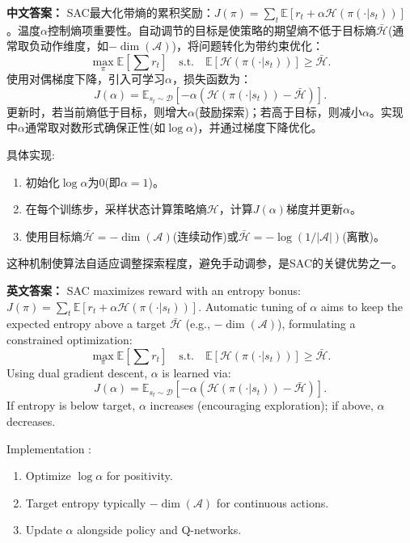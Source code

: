 \documentclass[10pt,a4paper]{ctexart}
\begin{document}
\textbf{中文答案：}  
SAC最大化带熵的累积奖励：\(J(\pi) = \sum_t \mathbb{E}[r_t + \alpha \mathcal{H}(\pi(\cdot|s_t))]\)。温度\(\alpha\)控制熵项重要性。自动调节的目标是使策略的期望熵不低于目标熵\(\bar{\mathcal{H}}\)(通常取负动作维度，如\(-\dim(\mathcal{A})\))，将问题转化为带约束优化：
\[
\max_\pi \mathbb{E}[\sum r_t] \quad \text{s.t.} \quad \mathbb{E}[\mathcal{H}(\pi(\cdot|s_t))] \ge \bar{\mathcal{H}}.
\]  
使用对偶梯度下降，引入可学习\(\alpha\)，损失函数为：
\[
J(\alpha) = \mathbb{E}_{s_t \sim \mathcal{D}} \left[ -\alpha \left( \mathcal{H}(\pi(\cdot|s_t)) - \bar{\mathcal{H}} \right) \right].
\]  
更新时，若当前熵低于目标，则增大\(\alpha\)(鼓励探索)；若高于目标，则减小\(\alpha\)。实现中\(\alpha\)通常取对数形式确保正性(如\(\log \alpha\))，并通过梯度下降优化。

 具体实现:
\begin{enumerate}
    \item 初始化\(\log \alpha\)为0(即\(\alpha=1\))。
    \item 在每个训练步，采样状态计算策略熵\(\mathcal{H}\)，计算\(J(\alpha)\)梯度并更新\(\alpha\)。
    \item 使用目标熵\(\bar{\mathcal{H}} = -\dim(\mathcal{A})\)(连续动作)或\(\bar{\mathcal{H}} = -\log(1/|\mathcal{A}|)\)(离散)。
\end{enumerate}

这种机制使算法自适应调整探索程度，避免手动调参，是SAC的关键优势之一。

\textbf{英文答案：}  
SAC maximizes reward with an entropy bonus: \(J(\pi) = \sum_t \mathbb{E}[r_t + \alpha \mathcal{H}(\pi(\cdot|s_t))]\). Automatic tuning of \(\alpha\) aims to keep the expected entropy above a target \(\bar{\mathcal{H}}\) (e.g., \(-\dim(\mathcal{A})\)), formulating a constrained optimization:
\[
\max_\pi \mathbb{E}[\sum r_t] \quad \text{s.t.} \quad \mathbb{E}[\mathcal{H}(\pi(\cdot|s_t))] \ge \bar{\mathcal{H}}.
\]  
Using dual gradient descent, \(\alpha\) is learned via:
\[
J(\alpha) = \mathbb{E}_{s_t \sim \mathcal{D}} \left[ -\alpha \left( \mathcal{H}(\pi(\cdot|s_t)) - \bar{\mathcal{H}} \right) \right].
\]  
If entropy is below target, \(\alpha\) increases (encouraging exploration); if above, \(\alpha\) decreases.

 Implementation :
\begin{enumerate}
    \item Optimize \(\log \alpha\) for positivity.
    \item Target entropy typically \(-\dim(\mathcal{A})\) for continuous actions.
    \item Update \(\alpha\) alongside policy and Q-networks.
\end{enumerate}
\end{document}
